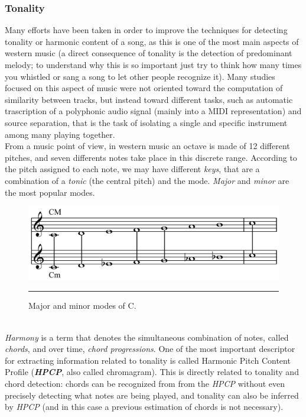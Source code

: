 \subsubsection{Tonality}
Many efforts have been taken in order to improve the techniques for detecting tonality or harmonic content of a song, as this is one of the most main aspects of western music (a direct consequence of tonality is the detection of predominant melody; to understand why this is so important just try to think how many times you whistled or sang a song to let other people recognize it). Many studies focused on this aspect of music were not oriented toward the computation of similarity between tracks, but instead toward different tasks, such as automatic trascription of a polyphonic audio signal (mainly into a MIDI representation) and source separation, that is the task of isolating a single and specific instrument among many playing together. \\
From a music point of view, in western music an octave is made of 12 different pitches, and seven differents notes take place in this discrete range. According to the pitch assigned to each note, we may have different \textit{keys}, that are a combination of a \textit{tonic} (the central pitch) and the mode. \textit{Major} and \textit{minor} are the most popular modes. 
\begin{figure}[h]
\begin{center}
\includegraphics[scale=0.15]{Figures/majorminor.png}
    \rule{20em}{0.5pt}
  \caption[Major and minor modes]{Major and minor modes of C.}
  \label{fig:GStreamer}
\end{center}
\end{figure} \\
\textit{Harmony} is a term that denotes the simultaneous combination of notes, called \textit{chords}, and over time, \textit{chord progressions}.  One of the most important descriptor for extracting information related to tonality is called Harmonic Pitch Content Profile (\textbf{\textit{HPCP}}, also called chromagram). This is directly related to tonality and chord detection: chords can be recognized from from the \textit{HPCP} without even precisely detecting what notes are being played, and tonality can also be inferred by \textit{HPCP} (and in this case a previous estimation of chords is not necessary). \\
